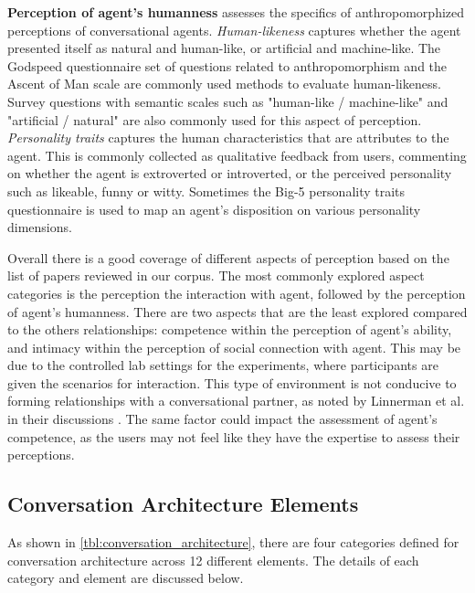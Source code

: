 \textbf{Perception of agent's humanness} assesses the specifics of anthropomorphized perceptions of conversational agents. \textit{Human-likeness} captures whether the agent presented itself as natural and human-like, or artificial and machine-like. The Godspeed questionnaire \cite{bartneck2009measurement} set of questions related to anthropomorphism and the Ascent of Man scale \cite{kteily2015ascent} are commonly used methods to evaluate human-likeness. Survey questions with semantic scales such as "human-like / machine-like" and "artificial / natural" are also commonly used for this aspect of perception. \textit{Personality traits} captures the human characteristics that are attributes to the agent. This is commonly collected as qualitative feedback from users, commenting on whether the agent is extroverted or introverted, or the perceived personality such as likeable, funny or witty. Sometimes the Big-5 personality traits questionnaire \cite{gosling2003very} is used to map an agent's disposition on various personality dimensions.

Overall there is a good coverage of different aspects of perception based on the list of papers reviewed in our corpus. The most commonly explored aspect categories is the perception the interaction with agent, followed by the perception of agent's humanness. There are two aspects that are the least explored compared to the others relationships: competence within the perception of agent's ability, and intimacy within the perception of social connection with agent. This may be due to the controlled lab settings for the experiments, where participants are given the scenarios for interaction. This type of environment is not conducive to forming relationships with a conversational partner, as noted by Linnerman et al. in their discussions \cite{linnemann2018can}\cmt{[15]}. The same factor could impact the assessment of agent's competence, as the users may not feel like they have the expertise to assess their perceptions. 




\subsection{Conversation Architecture Elements}

As shown in \autoref{tbl:conversation_architecture}, there are four categories defined for conversation architecture across 12 different elements. The details of each category and element are discussed below.

